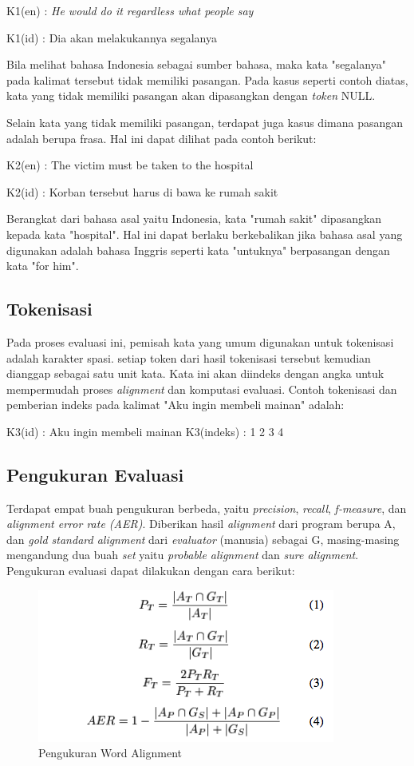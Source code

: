 K1(en) : \textit{He would do it regardless what people say}

K1(id) : Dia akan melakukannya segalanya


Bila melihat bahasa Indonesia sebagai sumber bahasa, maka kata "segalanya" pada kalimat tersebut tidak memiliki pasangan. Pada kasus seperti contoh diatas, kata yang tidak memiliki pasangan akan dipasangkan dengan \textit{token} NULL.


Selain kata yang tidak memiliki pasangan, terdapat juga kasus dimana pasangan adalah berupa frasa. Hal ini dapat dilihat pada contoh berikut:


K2(en) : The victim must be taken to the hospital

K2(id) : Korban tersebut harus di bawa ke rumah sakit


Berangkat dari bahasa asal yaitu Indonesia, kata "rumah sakit" dipasangkan kepada kata "hospital". Hal ini dapat berlaku berkebalikan jika bahasa asal yang digunakan adalah bahasa Inggris seperti kata "untuknya" berpasangan dengan kata "for him".

\subsection{Tokenisasi}
Pada proses evaluasi ini, pemisah kata yang umum digunakan untuk tokenisasi adalah karakter spasi. setiap token dari hasil tokenisasi tersebut kemudian dianggap sebagai satu unit kata. Kata ini akan diindeks dengan angka untuk mempermudah proses \textit{alignment} dan komputasi evaluasi. Contoh tokenisasi dan pemberian indeks pada kalimat "Aku ingin membeli mainan" adalah:

K3(id) : Aku ingin membeli mainan
K3(indeks) : 1 2 3 4

\subsection{Pengukuran Evaluasi}
Terdapat empat buah pengukuran berbeda, yaitu \textit{precision}, \textit{recall}, \textit{f-measure}, dan \textit{alignment error rate (AER)}. Diberikan hasil \textit{alignment} dari program berupa A, dan \textit{gold standard alignment} dari \textit{evaluator} (manusia) sebagai G, masing-masing mengandung dua buah \textit{set} yaitu \textit{probable alignment} dan \textit{sure alignment}. Pengukuran evaluasi dapat dilakukan dengan cara berikut:

\begin{figure}
	\centering
	\includegraphics[width=1\linewidth]{adit_pics/Pengukuran-Word-Alignment}
	\caption{Pengukuran Word Alignment}
	\label{fig:Pengukuran-Word-Alignment}
\end{figure}
